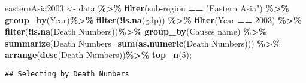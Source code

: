 \documentclass[
]{article}
\newenvironment{Shaded}{\begin{snugshade}}{\end{snugshade}}
\newcommand{\AttributeTok}[1]{\textcolor[rgb]{0.13,0.29,0.53}{#1}}
\newcommand{\DecValTok}[1]{\textcolor[rgb]{0.00,0.00,0.81}{#1}}
\newcommand{\FunctionTok}[1]{\textcolor[rgb]{0.13,0.29,0.53}{\textbf{#1}}}
\newcommand{\NormalTok}[1]{#1}
\newcommand{\OtherTok}[1]{\textcolor[rgb]{0.56,0.35,0.01}{#1}}
\newcommand{\SpecialCharTok}[1]{\textcolor[rgb]{0.81,0.36,0.00}{\textbf{#1}}}
\newcommand{\StringTok}[1]{\textcolor[rgb]{0.31,0.60,0.02}{#1}}
\begin{document}
\begin{Shaded}
\begin{Highlighting}[]
\NormalTok{easternAsia2003 }\OtherTok{\textless{}{-}}\NormalTok{ data }\SpecialCharTok{\%\textgreater{}\%}
\FunctionTok{filter}\NormalTok{(}\StringTok{\textasciigrave{}}\AttributeTok{sub{-}region}\StringTok{\textasciigrave{}} \SpecialCharTok{==} \StringTok{"Eastern Asia"}\NormalTok{)  }\SpecialCharTok{\%\textgreater{}\%}
\FunctionTok{group\_by}\NormalTok{(Year)}\SpecialCharTok{\%\textgreater{}\%}
\FunctionTok{filter}\NormalTok{(}\SpecialCharTok{!}\FunctionTok{is.na}\NormalTok{(gdp)) }\SpecialCharTok{\%\textgreater{}\%}
\FunctionTok{filter}\NormalTok{(Year }\SpecialCharTok{==} \DecValTok{2003}\NormalTok{) }\SpecialCharTok{\%\textgreater{}\%}
\FunctionTok{filter}\NormalTok{(}\SpecialCharTok{!}\FunctionTok{is.na}\NormalTok{(}\StringTok{\textasciigrave{}}\AttributeTok{Death Numbers}\StringTok{\textasciigrave{}}\NormalTok{))}\SpecialCharTok{\%\textgreater{}\%}
  \FunctionTok{group\_by}\NormalTok{(}\StringTok{\textasciigrave{}}\AttributeTok{Causes name}\StringTok{\textasciigrave{}}\NormalTok{) }\SpecialCharTok{\%\textgreater{}\%}
  \FunctionTok{summarize}\NormalTok{(}\StringTok{\textasciigrave{}}\AttributeTok{Death Numbers}\StringTok{\textasciigrave{}}\OtherTok{=}\FunctionTok{sum}\NormalTok{(}\FunctionTok{as.numeric}\NormalTok{(}\StringTok{\textasciigrave{}}\AttributeTok{Death Numbers}\StringTok{\textasciigrave{}}\NormalTok{))) }\SpecialCharTok{\%\textgreater{}\%}
  \FunctionTok{arrange}\NormalTok{(}\FunctionTok{desc}\NormalTok{(}\StringTok{\textasciigrave{}}\AttributeTok{Death Numbers}\StringTok{\textasciigrave{}}\NormalTok{))}\SpecialCharTok{\%\textgreater{}\%}
  \FunctionTok{top\_n}\NormalTok{(}\DecValTok{5}\NormalTok{);}
\end{Highlighting}
\end{Shaded}

\begin{verbatim}
## Selecting by Death Numbers
\end{verbatim}
\end{document}
